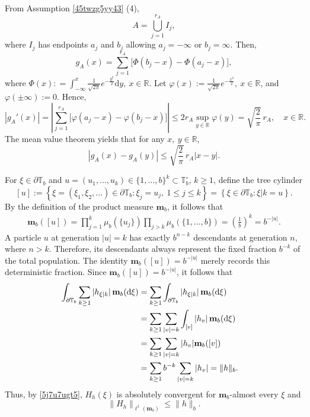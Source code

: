 \documentclass[a4paper, 11pt]{article}
\newcommand{\1}{\mathbf 1}
\theoremstyle{plain}
\begin{document}
From Assumption \ref{45twzg5yy43} (4),
\[
  A=\bigcup_{j=1}^{r_A}I_j,
\]
where $I_j$ has endpoints $a_j$ and $b_j$ allowing \(a_j=-\infty\) or \(b_j=\infty\). Then,
\begin{equation}\label{eq:gA-endpoints}
  g_A(x)
  =
  \sum_{j=1}^{r_A}
  \bigl[\Phi(b_j-x)-\Phi(a_j-x)\bigr],
\end{equation}
where \(\Phi(x): =\int^{x}_{-\infty}\frac{1}{\sqrt{2\pi}}e^{-\frac{y^2}{2}}\mathrm{d} y,~x\in\mathbb{R}\). Let \(\varphi(x):=\frac{1}{\sqrt{2\pi}}e^{-\frac{x^2}{2}},~x\in\mathbb{R}\), and
\(\varphi(\pm\infty):=0\).  Hence,
\begin{equation}\label{eq:gA-explicit-Lipschitz}
  |g_A'(x)|
  =
  |\sum_{j=1}^{r_A}
  \bigl[\varphi(a_j-x)-\varphi(b_j-x)\bigr]|
  \leq
  2r_A\sup_{y\in \mathbb{R}}\varphi(y)
  =
  \sqrt{\frac{2}{\pi}}\,r_A,
  \quad x\in \mathbb{R}.
\end{equation}
The mean value theorem yields that for any $x,~y\in\mathbb{R}$,
\begin{equation}\label{eq:gA-Lipschitz}
  |g_A(x)-g_A(y)|
  \leq
  \sqrt{\frac{2}{\pi}}\,r_A|x-y|.
\end{equation}
\par

For \(\xi\in\partial\mathbb T_b\) and \(u=(u_1,\ldots,u_k)\in\{1,\ldots,b\}^k\subset\mathbb T^{\circ}_b\), $k\geq1$, define the
tree cylinder
$$
  [u]
  :=
  \left\{
    \xi=(\xi_1,\xi_2,...)\in\partial\mathbb T_b:
    \xi_j=u_j,\ 1\leq j\leq k
  \right\}
  =
  \left\{
    \xi\in\partial\mathbb T_b:\xi|k=u
  \right\}.
$$
By the definition of the product measure $\mathbf m_b$, it follows that
\begin{align}
  \mathbf m_b([u])=
  \prod_{j=1}^{k}\mu_b(\{u_j\})
  \prod_{j>k}\mu_b(\{1,\ldots,b\})
  =
  \left(\frac{1}{b}\right)^k=
  b^{-|u|}.\nonumber
\end{align}
A particle \(u\) at generation
\(|u|=k\) has exactly \(b^{n-k}\) descendants at generation \(n\), where $n>k$. Therefore,
its descendants always represent the fixed fraction \(b^{-k}\) of the total
population. The identity \(\mathbf m_b([u])=b^{-|u|}\) merely records this
deterministic fraction. Since
\(\mathbf m_b([u])=b^{-|u|}\), it follows that
\begin{align}\label{eq:path-L1}
  \int_{\partial\mathbb{T}_b}
  \sum_{k\geq1}|h_{\xi|k}|\,\mathbf m_b(\mathrm{d}\xi)
  &=
  \sum_{k\geq1}\int_{\partial\mathbb{T}_b}
  |h_{\xi|k}|\,\mathbf m_b(\mathrm{d}\xi)\cr
   &=
  \sum_{k\geq1}\sum_{|v|=k}\int_{[v]}
  |h_{v}|\,\mathbf m_b(\mathrm{d}\xi)\cr
  &=
  \sum_{k\geq1}\sum_{|v|=k}
  |h_v|\mathbf m_b([v])\cr
  &=\sum_{k\geq1}b^{-k}\sum_{|v|=k}|h_v|=\|h\|_b.
\end{align}
Thus, by \eqref{5j7u7ugt5}, \(H_h(\xi)\) is absolutely convergent for
\(\mathbf m_b\)-almost every $\xi$ and
\begin{equation}\label{eq:path-map-bound}
  \|H_h\|_{{\ell}^1(\mathbf m_b)}\leq\|h\|_b.
\end{equation}
\par
\end{document}
